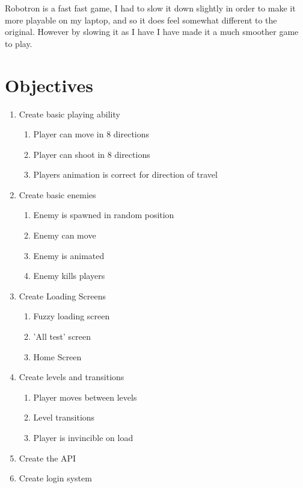 \documentclass[a4paper, 11pt]{report}
\begin{document}
Robotron is a fast fast game, I had to slow it down slightly in order to make it more playable on my laptop, and so it does feel somewhat different to the original. However by slowing it as I have I have made it a much smoother game to play.

\section{Objectives}
\begin{enumerate}
    \item Create basic playing ability
        \begin{enumerate}
            \item Player can move in 8 directions
            \item Player can shoot in 8 directions
            \item Players animation is correct for direction of travel
        \end{enumerate}
    \item Create basic enemies
        \begin{enumerate}
            \item Enemy is spawned in random position
            \item Enemy can move
            \item Enemy is animated
            \item Enemy kills players
        \end{enumerate}
    \item Create Loading Screens
        \begin{enumerate}
            \item Fuzzy loading screen
            \item 'All test' screen
            \item Home Screen
        \end{enumerate}
    \item Create levels and transitions
        \begin{enumerate}
            \item Player moves between levels
            \item Level transitions
            \item Player is invincible on load
        \end{enumerate}
    \item Create the API
    \item Create login system
        \begin{enumerate}

\end{enumerate}
\end{enumerate}
\end{document}
